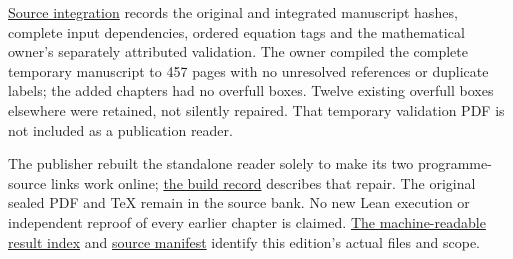 \documentclass[
]{article}
\begin{document}
\href{SOURCE_INTEGRATION.json}{Source integration} records the original
and integrated manuscript hashes, complete input dependencies, ordered
equation tags and the mathematical owner's separately attributed
validation. The owner compiled the complete temporary manuscript to 457
pages with no unresolved references or duplicate labels; the added
chapters had no overfull boxes. Twelve existing overfull boxes elsewhere
were retained, not silently repaired. That temporary validation PDF is
not included as a publication reader.

The publisher rebuilt the standalone reader solely to make its two
programme-source links work online; \href{READER_BUILD.json}{the build
record} describes that repair. The original sealed PDF and TeX remain in
the source bank. No new Lean execution or independent reproof of every
earlier chapter is claimed. \href{RESULT_INDEX.json}{The
machine-readable result index} and \href{SOURCE_MANIFEST.json}{source
manifest} identify this edition's actual files and scope.
\end{document}
